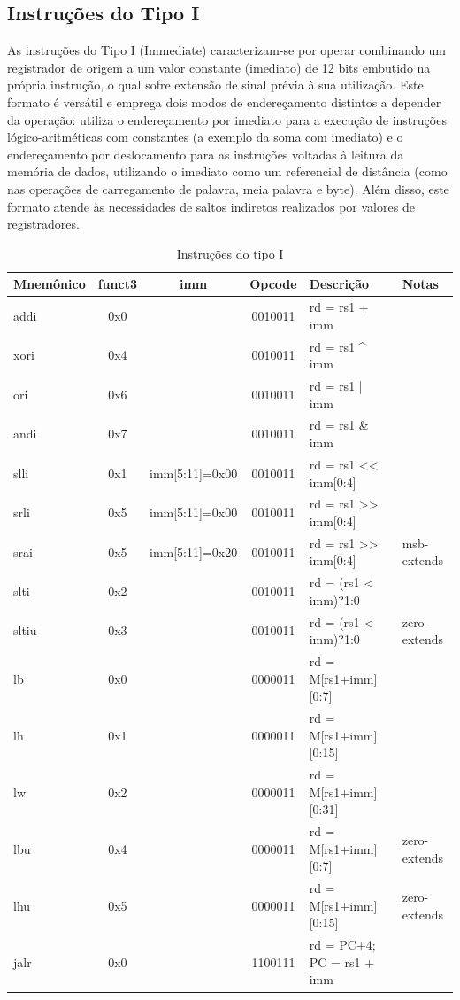\documentclass[
	12pt,				%
	oneside,
	a4paper,			%
	english,			%
	french,				%
	spanish,			%
	brazil,				%
	]{abntex2}
\begin{document}
\subsection{Instruções do Tipo I}
As instruções do Tipo I (Immediate) caracterizam-se por operar combinando um registrador de origem a um valor constante (imediato) de 12 bits embutido na própria instrução, o qual sofre extensão de sinal prévia à sua utilização. Este formato é versátil e emprega dois modos de endereçamento distintos a depender da operação: utiliza o endereçamento por imediato para a execução de instruções lógico-aritméticas com constantes (a exemplo da soma com imediato) e o endereçamento por deslocamento para as instruções voltadas à leitura da memória de dados, utilizando o imediato como um referencial de distância (como nas operações de carregamento de palavra, meia palavra e byte). Além disso, este formato atende às necessidades de saltos indiretos realizados por valores de registradores.

\begin{table}[H]
\centering
\caption{Instruções do tipo I} \label{tab:IType}
\ABNTEXfontereduzida
\begin{tabular}{|l|c|c|c|l|l|}
\multicolumn{1}{l}{Mnemônico} & \multicolumn{1}{c}{funct3} & \multicolumn{1}{c}{imm} & \multicolumn{1}{c}{Opcode} & \multicolumn{1}{l}{Descrição} & \multicolumn{1}{l}{Notas} \\ \hline
addi  & 0x0 & & 0010011 & rd = rs1 + imm & \\ \hline
xori  & 0x4 & & 0010011 & rd = rs1 \textasciicircum{} imm & \\ \hline
ori   & 0x6 & & 0010011 & rd = rs1 | imm & \\ \hline
andi  & 0x7 & & 0010011 & rd = rs1 \& imm & \\ \hline
slli  & 0x1 & imm[5:11]=0x00 & 0010011 & rd = rs1 \textless{}\textless{} imm[0:4] & \\ \hline
srli  & 0x5 & imm[5:11]=0x00 & 0010011 & rd = rs1 \textgreater{}\textgreater{} imm[0:4] & \\ \hline
srai  & 0x5 & imm[5:11]=0x20 & 0010011 & rd = rs1 \textgreater{}\textgreater{} imm[0:4] & msb-extends \\ \hline
slti  & 0x2 & & 0010011 & rd = (rs1 \textless{} imm)?1:0 & \\ \hline
sltiu & 0x3 & & 0010011 & rd = (rs1 \textless{} imm)?1:0 & zero-extends \\ \hline
lb    & 0x0 & & 0000011 & rd = M[rs1+imm][0:7] & \\ \hline
lh    & 0x1 & & 0000011 & rd = M[rs1+imm][0:15] & \\ \hline
lw    & 0x2 & & 0000011 & rd = M[rs1+imm][0:31] & \\ \hline
lbu   & 0x4 & & 0000011 & rd = M[rs1+imm][0:7] & zero-extends \\ \hline
lhu   & 0x5 & & 0000011 & rd = M[rs1+imm][0:15] & zero-extends \\ \hline
jalr  & 0x0 & & 1100111 & rd = PC+4; PC = rs1 + imm & \\ \hline
\end{tabular}
\end{table}
\end{document}

